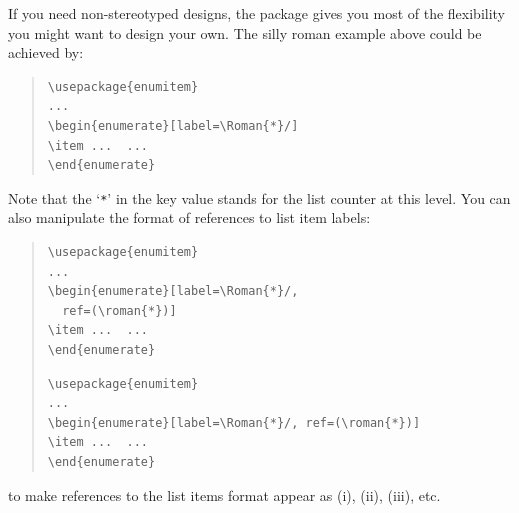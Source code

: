 If you need non-stereotyped designs, the  package
gives you most of the flexibility you might want to design your own.
The silly roman example above could be achieved by:
\begin{quote}
\begin{verbatim}
\usepackage{enumitem}
...
\begin{enumerate}[label=\Roman{*}/]
\item ...  ...
\end{enumerate}
\end{verbatim}
\end{quote}
Note that the `\texttt{*}' in the key value stands for the list
counter at this level.  You can also manipulate the format of
references to list item labels:
\begin{quote}
\begin{narrowversion}
\begin{verbatim}
\usepackage{enumitem}
...
\begin{enumerate}[label=\Roman{*}/,
  ref=(\roman{*})]
\item ...  ...
\end{enumerate}
\end{verbatim}
\end{narrowversion}
\begin{wideversion}
\begin{verbatim}
\usepackage{enumitem}
...
\begin{enumerate}[label=\Roman{*}/, ref=(\roman{*})]
\item ...  ...
\end{enumerate}
\end{verbatim}
\end{wideversion}
\end{quote}
to make references to the list items format appear as (i), (ii),
(iii), etc.

